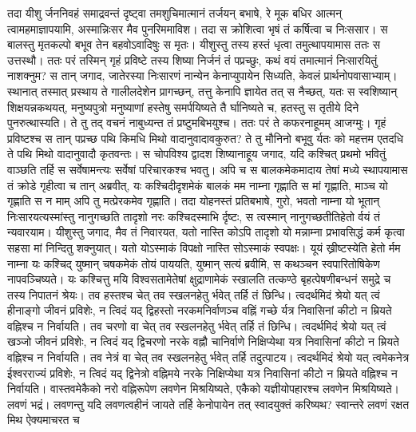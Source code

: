 \vakya तदा यीशु र्जननिवहं समाद्रवन्तं दृष्ट्वा तमशुचिमात्मानं तर्जयन् बभाषे, रे मूक बधिर आत्मन् त्वामहमाज्ञापयामि, अस्मान्निःसर मैव पुनरिममाविश।
\vakya तदा स क्रोशित्वा भृषं तं कर्षित्वा च निःससार। स बालस्तु मृतकल्पो बभूव तेन बहवोऽवादिषुः स मृतः।
\vakya यीशुस्तु तस्य हस्तं धृत्वा तमुत्थापयामास ततः स उत्तस्थौ।
\vakya ततः परं तस्मिन् गृहं प्रविष्टे तस्य शिष्या निर्जनं तं पप्रच्छुः, कथं वयं तमात्मानं निःसारयितुं नाशक्नुम?
\vakya स तान् जगाद, जातेरस्या निःसारणं नान्येन केनाप्युपायेन सिध्यति, केवलं प्रार्थनोपवासाभ्याम्।
\vakya स्थानात् तस्मात् प्रस्थाय ते गालीलदेशेन प्रागच्छन्, तत्तु केनापि ज्ञायेत तत् स नैच्छत्,
\vakya यतः स स्वशिष्यान् शिक्षयन्नकथयत्, मनुष्यपुत्रो मनुष्याणां हस्तेषु समर्पयिष्यते तै र्घानिष्यते च, हतस्तु स तृतीये दिने पुनरुत्थास्यति।
\vakya ते तु तद् वचनं नाबुध्यन्त तं प्रष्टुमबिभयुश्च।
\vakya ततः परं ते कफरनाहूमम् आजग्मुः। गृहं प्रविष्टश्च स तान् पप्रच्छ पथि किमधि मिथो वादानुवादावकुरुत?
\vakya ते तु मौनिनो बभूवु र्यतः को महत्तम एतदधि ते पथि मिथो वादानुवादौ कृतवन्तः।
\vakya स चोपविश्य द्वादश शिष्यानाहूय जगाद, यदि कश्चित् प्रथमो भवितुं वाञ्छति तर्हि स सर्वेषामन्त्यः सर्वेषां परिचारकश्च भवतु।
\vakya अपि च स बालकमेकमादाय तेषां मध्ये स्थापयामास तं क्रोडे गृहीत्वा च तान् अब्रवीत्,
\vakya यः कश्चिदीदृशमेकं बालकं मम नाम्ना गृह्णाति स मां गृह्णाति, माञ्च यो गृह्णाति स न माम् अपि तु मत्प्रेरकमेव गृह्णाति।
\vakya तदा योहनस्तं प्रतिबभाषे, गुरो, भवतो नाम्ना यो भूतान् निःसारयत्यस्मांस्तु नानुगच्छति तादृशो नरः कश्चिदस्माभि र्दृष्टः, स त्वस्मान् नानुगच्छतीतिहेतो र्वयं तं न्यवारयाम।
\vakya यीशुस्तु जगाद, मैव तं निवारयत, यतो नास्ति कोऽपि तादृशो यो मन्नाम्ना प्रभावसिद्धं कर्म कृत्वा सहसा मां निन्दितु शक्नुयात्।
\vakya यतो योऽस्माकं विपक्षो नास्ति सोऽस्माकं स्वपक्षः।
\vakya यूयं ख्रीष्टस्येति हेतो र्मम नाम्ना यः कश्चिद् युष्मान् चषकमेकं तोयं पाययति, युष्मान् सत्यं ब्रवीमि, स कथञ्चन स्वपारितोषिकेण नापवञ्चिष्यते।
\vakya यः कश्चित्तु मयि विश्वसतामेतेषां क्षुद्राणामेकं स्खालति तत्कण्ठे बृहत्पेषणीबन्धनं समुद्रे च तस्य निपातनं श्रेयः।
\vakya तव हस्तश्च चेत् तव स्खलनहेतु र्भवेत् तर्हि तं छिन्धि।
\vakya त्वदर्थमिदं श्रेयो यत् त्वं हीनाङ्गो जीवनं प्रविशेः, न त्विदं यद् द्विहस्तो नरकमनिर्वाणञ्च वह्निं गच्छे र्यत्र निवासिनां कीटो न म्रियते वह्निश्च न निर्वायति।
\vakya तव चरणो वा चेत् तव स्खलनहेतु र्भवेत् तर्हि तं छिन्धि।
\vakya त्वदर्थमिदं श्रेयो यत् त्वं खञ्जो जीवनं प्रविशेः, न त्विदं यद् द्विचरणो नरके वह्नौ चानिर्वाणे निक्षिप्येथा यत्र निवासिनां कीटो न म्रियते वह्निश्च न निर्वायति।
\vakya तव नेत्रं वा चेत् तव स्खलनहेतु र्भवेत् तर्हि तदुत्पाटय।
\vakya त्वदर्थमिदं श्रेयो यत् त्वमेकनेत्र ईश्वरराज्यं प्रविशेः, न त्विदं यद् द्विनेत्रो वह्निमये नरके निक्षिप्येथा यत्र निवासिनां कीटो न म्रियते वह्निश्च न निर्वायति।
\vakya वास्तवमेकैको नरो वह्निरूपेण लवणेन मिश्रयिष्यते, एकैको यज्ञीयोपहारश्च लवणेन मिश्रयिष्यते। लवणं भद्रं।
\vakya लवणन्तु यदि लवणत्वहीनं जायते तर्हि केनोपायेन तत् स्वादयुक्तं करिष्यथ? स्वान्तरे लवणं रक्षत मिथ ऐक्यमाचरत च\eoc